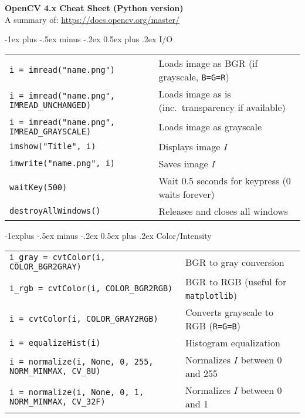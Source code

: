 \documentclass[10pt,landscape, a4paper]{article}
\makeatletter
\renewcommand{\section}{\@startsection{section}{1}{0mm}%
                                {-1ex plus -.5ex minus -.2ex}%
                                {0.5ex plus .2ex}%
                                {\normalfont\large\bfseries}}
\renewcommand{\subsection}{\@startsection{subsection}{2}{0mm}%
                                {-1explus -.5ex minus -.2ex}%
                                {0.5ex plus .2ex}%
                                {\normalfont\normalsize\bfseries}}
\makeatother
\begin{document}
\raggedright
\footnotesize
\begin{multicols}{2}


\setlength{\premulticols}{1pt}
\setlength{\postmulticols}{1pt}
\setlength{\multicolsep}{1pt}
\setlength{\columnsep}{2pt}

\begin{center}
     \Large{\textbf{OpenCV 4.x Cheat Sheet (Python version)}} \\
     \small{A summary of: \url{https://docs.opencv.org/master/}}
\end{center}

\section{I/O}
\begin{tabular}{@{}ll@{}}
\texttt{i = imread("name.png")}    & Loads image as BGR (if grayscale, \texttt{B=G=R})\\
\texttt{i = imread("name.png", IMREAD_UNCHANGED)}    & Loads image as is (inc.\ transparency if available)\\
\texttt{i = imread("name.png", IMREAD_GRAYSCALE)} & Loads image as grayscale\\
\texttt{imshow("Title", i)} & Displays image $I$\\
\texttt{imwrite("name.png", i)} & Saves image $I$\\
\texttt{waitKey(500)} & Wait 0.5 seconds for keypress (0 waits forever)\\
\texttt{destroyAllWindows()} & Releases and closes all windows\\
\end{tabular}


\subsection{Color/Intensity}
\newlength{\MyLen}
\begin{tabular}{@{}ll@{}}
\texttt{i_gray = cvtColor(i, COLOR_BGR2GRAY)}& BGR to gray conversion\\
\texttt{i_rgb = cvtColor(i, COLOR_BGR2RGB)}& BGR to RGB (useful for \texttt{matplotlib})\\
\texttt{i = cvtColor(i, COLOR_GRAY2RGB)}& Converts grayscale to RGB (\texttt{R=G=B})\\
\texttt{i = equalizeHist(i)}& Histogram equalization\\
\texttt{i = normalize(i, None, 0, 255, NORM_MINMAX, CV_8U)} & Normalizes $I$ between 0 and 255\\
\texttt{i = normalize(i, None, 0, 1, NORM_MINMAX, CV_32F)} & Normalizes $I$ between 0 and 1
\end{tabular}

\end{multicols}
\end{document}
